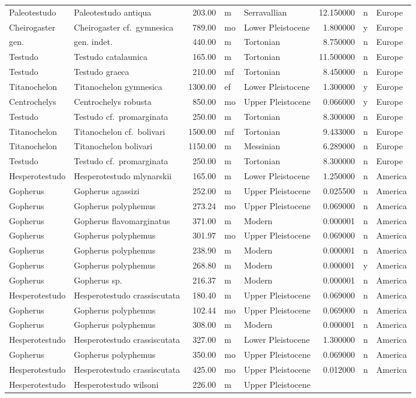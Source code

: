 \documentclass[]{article}
\begin{document}
\begin{longtable}[]{@{}llrllrll@{}}
Paleotestudo & Paleotestudo antiqua & 203.00 & m & Serravallian &
12.150000 & n & Europe\tabularnewline
Cheirogaster & Cheirogaster cf.~gymnesica & 789.00 & mo & Lower
Pleistocene & 1.800000 & y & Europe\tabularnewline
gen. & gen. indet. & 440.00 & m & Tortonian & 8.750000 & n &
Europe\tabularnewline
Testudo & Testudo catalaunica & 165.00 & m & Tortonian & 11.500000 & n &
Europe\tabularnewline
Testudo & Testudo graeca & 210.00 & mf & Tortonian & 8.450000 & n &
Europe\tabularnewline
Titanochelon & Titanochelon gymnesica & 1300.00 & ef & Lower Pleistocene
& 1.300000 & y & Europe\tabularnewline
Centrochelys & Centrochelys robusta & 850.00 & mo & Upper Pleistocene &
0.066000 & y & Europe\tabularnewline
Testudo & Testudo cf.~promarginata & 250.00 & m & Tortonian & 8.300000 &
n & Europe\tabularnewline
Titanochelon & Titanochelon cf.~bolivari & 1500.00 & mf & Tortonian &
9.433000 & n & Europe\tabularnewline
Titanochelon & Titanochelon bolivari & 1150.00 & m & Messinian &
6.289000 & n & Europe\tabularnewline
Testudo & Testudo cf.~promarginata & 250.00 & m & Tortonian & 8.300000 &
n & Europe\tabularnewline
Hesperotestudo & Hesperotestudo mlynarskii & 165.00 & m & Lower
Pleistocene & 1.250000 & n & America\tabularnewline
Gopherus & Gopherus agassizi & 252.00 & m & Upper Pleistocene & 0.025500
& n & America\tabularnewline
Gopherus & Gopherus polyphemus & 273.24 & mo & Upper Pleistocene &
0.069000 & n & America\tabularnewline
Gopherus & Gopherus flavomarginatus & 371.00 & m & Modern & 0.000001 & n
& America\tabularnewline
Gopherus & Gopherus polyphemus & 301.97 & mo & Upper Pleistocene &
0.069000 & n & America\tabularnewline
Gopherus & Gopherus polyphemus & 238.90 & m & Modern & 0.000001 & n &
America\tabularnewline
Gopherus & Gopherus polyphemus & 268.80 & m & Modern & 0.000001 & y &
America\tabularnewline
Gopherus & Gopherus sp. & 216.37 & m & Modern & 0.000001 & n &
America\tabularnewline
Hesperotestudo & Hesperotestudo crassiscutata & 180.40 & m & Upper
Pleistocene & 0.069000 & n & America\tabularnewline
Gopherus & Gopherus polyphemus & 102.44 & mo & Upper Pleistocene &
0.069000 & n & America\tabularnewline
Gopherus & Gopherus polyphemus & 308.00 & m & Modern & 0.000001 & n &
America\tabularnewline
Hesperotestudo & Hesperotestudo crassiscutata & 327.00 & m & Lower
Pleistocene & 1.300000 & n & America\tabularnewline
Gopherus & Gopherus polyphemus & 350.00 & mo & Upper Pleistocene &
0.069000 & n & America\tabularnewline
Hesperotestudo & Hesperotestudo crassiscutata & 425.00 & mo & Upper
Pleistocene & 0.012000 & n & America\tabularnewline
Hesperotestudo & Hesperotestudo wilsoni & 226.00 & m & Upper Pleistocene

\end{longtable}
\end{document}
